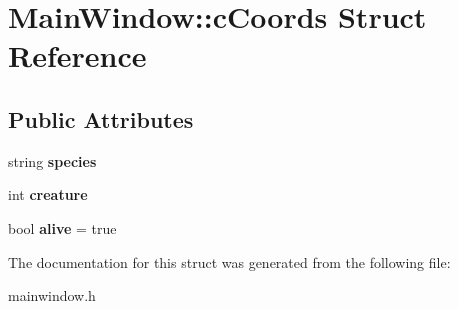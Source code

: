 \hypertarget{struct_main_window_1_1c_coords}{}\section{Main\+Window\+:\+:c\+Coords Struct Reference}
\label{struct_main_window_1_1c_coords}
\subsection*{Public Attributes}
\begin{DoxyCompactItemize}
\item 
\mbox{\label{struct_main_window_1_1c_coords_aa1dd48a05150578d260c9b8e66d6ef40}} 
string {\bfseries species}
\item 
\mbox{\label{struct_main_window_1_1c_coords_ab1c75602ae902c641a3b5a17574d1ede}} 
int {\bfseries creature}
\item 
\mbox{\label{struct_main_window_1_1c_coords_a916584d859f0b4b674933aa438497599}} 
bool {\bfseries alive} = true
\end{DoxyCompactItemize}


The documentation for this struct was generated from the following file\+:\begin{DoxyCompactItemize}
\item 
mainwindow.\+h\end{DoxyCompactItemize}
